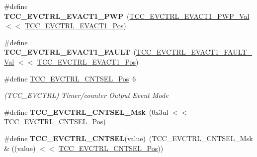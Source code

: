 \begin{DoxyCompactItemize}
\item 
\hypertarget{group___s_a_m_l21___t_c_c_ga4a6ed04ca8ae13ab71dca11954920488}{}\#define {\bfseries T\+C\+C\+\_\+\+E\+V\+C\+T\+R\+L\+\_\+\+E\+V\+A\+C\+T1\+\_\+\+P\+W\+P}~(\hyperlink{group___s_a_m_l21___t_c_c_ga3c8260261d3246656b53ff1a1df3dbd4}{T\+C\+C\+\_\+\+E\+V\+C\+T\+R\+L\+\_\+\+E\+V\+A\+C\+T1\+\_\+\+P\+W\+P\+\_\+\+Val}     $<$$<$ \hyperlink{group___s_a_m_l21___t_c_c_gada1f071c882b1c68121a6d6db44527e2}{T\+C\+C\+\_\+\+E\+V\+C\+T\+R\+L\+\_\+\+E\+V\+A\+C\+T1\+\_\+\+Pos})\label{group___s_a_m_l21___t_c_c_ga4a6ed04ca8ae13ab71dca11954920488}

\item 
\hypertarget{group___s_a_m_l21___t_c_c_gaf5234e24eadd67e384cbb68a9f979a98}{}\#define {\bfseries T\+C\+C\+\_\+\+E\+V\+C\+T\+R\+L\+\_\+\+E\+V\+A\+C\+T1\+\_\+\+F\+A\+U\+L\+T}~(\hyperlink{group___s_a_m_l21___t_c_c_ga3de4e07c14fc85cfbb1f76b8f5049f46}{T\+C\+C\+\_\+\+E\+V\+C\+T\+R\+L\+\_\+\+E\+V\+A\+C\+T1\+\_\+\+F\+A\+U\+L\+T\+\_\+\+Val}   $<$$<$ \hyperlink{group___s_a_m_l21___t_c_c_gada1f071c882b1c68121a6d6db44527e2}{T\+C\+C\+\_\+\+E\+V\+C\+T\+R\+L\+\_\+\+E\+V\+A\+C\+T1\+\_\+\+Pos})\label{group___s_a_m_l21___t_c_c_gaf5234e24eadd67e384cbb68a9f979a98}

\item 
\hypertarget{group___s_a_m_l21___t_c_c_gae74d96924a85770b114b26497558bc10}{}\#define \hyperlink{group___s_a_m_l21___t_c_c_gae74d96924a85770b114b26497558bc10}{T\+C\+C\+\_\+\+E\+V\+C\+T\+R\+L\+\_\+\+C\+N\+T\+S\+E\+L\+\_\+\+Pos}~6\label{group___s_a_m_l21___t_c_c_gae74d96924a85770b114b26497558bc10}

\begin{DoxyCompactList}\small\item\em (T\+C\+C\+\_\+\+E\+V\+C\+T\+R\+L) Timer/counter Output Event Mode \end{DoxyCompactList}\item 
\hypertarget{group___s_a_m_l21___t_c_c_ga48833b57b98f4ce5c2c8150e207c272a}{}\#define {\bfseries T\+C\+C\+\_\+\+E\+V\+C\+T\+R\+L\+\_\+\+C\+N\+T\+S\+E\+L\+\_\+\+Msk}~(0x3ul $<$$<$ T\+C\+C\+\_\+\+E\+V\+C\+T\+R\+L\+\_\+\+C\+N\+T\+S\+E\+L\+\_\+\+Pos)\label{group___s_a_m_l21___t_c_c_ga48833b57b98f4ce5c2c8150e207c272a}

\item 
\hypertarget{group___s_a_m_l21___t_c_c_ga67f86a22d2c313cb8799ce1458158602}{}\#define {\bfseries T\+C\+C\+\_\+\+E\+V\+C\+T\+R\+L\+\_\+\+C\+N\+T\+S\+E\+L}(value)~(T\+C\+C\+\_\+\+E\+V\+C\+T\+R\+L\+\_\+\+C\+N\+T\+S\+E\+L\+\_\+\+Msk \& ((value) $<$$<$ \hyperlink{group___s_a_m_l21___t_c_c_gae74d96924a85770b114b26497558bc10}{T\+C\+C\+\_\+\+E\+V\+C\+T\+R\+L\+\_\+\+C\+N\+T\+S\+E\+L\+\_\+\+Pos}))\label{group___s_a_m_l21___t_c_c_ga67f86a22d2c313cb8799ce1458158602}


\end{DoxyCompactItemize}
